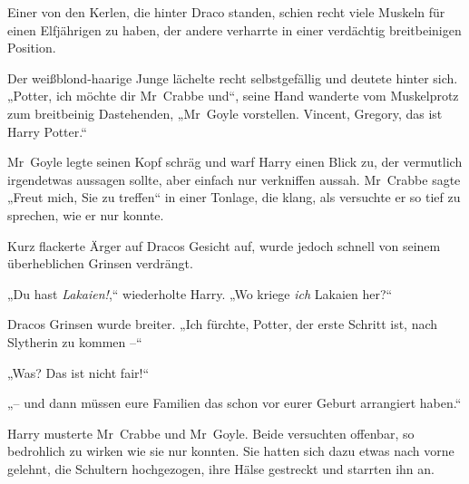 Einer von den Kerlen, die hinter Draco standen, schien recht viele Muskeln für einen Elfjährigen zu haben, der andere verharrte in einer verdächtig breitbeinigen Position.

Der weißblond-haarige Junge lächelte recht selbstgefällig und deutete hinter sich. „Potter, ich möchte dir Mr~Crabbe und“, seine Hand wanderte vom Muskelprotz zum breitbeinig Dastehenden, „Mr~Goyle vorstellen. Vincent, Gregory, das ist Harry Potter.“

Mr~Goyle legte seinen Kopf schräg und warf Harry einen Blick zu, der vermutlich irgendetwas aussagen sollte, aber einfach nur verkniffen aussah. Mr~Crabbe sagte „Freut mich, Sie zu treffen“ in einer Tonlage, die klang, als versuchte er so tief zu sprechen, wie er nur konnte.

Kurz flackerte Ärger auf Dracos Gesicht auf, wurde jedoch schnell von seinem überheblichen Grinsen verdrängt.

„Du hast \emph{Lakaien!},“ wiederholte Harry. „Wo kriege \emph{ich} Lakaien her?“

Dracos Grinsen wurde breiter. „Ich fürchte, Potter, der erste Schritt ist, nach Slytherin zu kommen –“

„Was? Das ist nicht fair!“

„– und dann müssen eure Familien das schon vor eurer Geburt arrangiert haben.“

Harry musterte Mr~Crabbe und Mr~Goyle. Beide versuchten offenbar, so bedrohlich zu wirken wie sie nur konnten. Sie hatten sich dazu etwas nach vorne gelehnt, die Schultern hochgezogen, ihre Hälse gestreckt und starrten ihn an.

